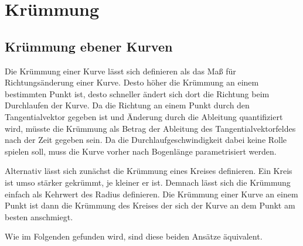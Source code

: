 \section{Krümmung}
\subsection{Krümmung ebener Kurven}

Die Krümmung einer Kurve lässt sich definieren als das Maß für
Richtungsänderung einer Kurve. Desto höher die Krümmung an einem
bestimmten Punkt ist, desto schneller ändert sich dort die
Richtung beim Durchlaufen der Kurve. Da die Richtung an einem
Punkt durch den Tangentialvektor gegeben ist und Änderung
durch die Ableitung quantifiziert wird, müsste die Krümmung
als Betrag der Ableitung des Tangentialvektorfeldes nach der Zeit
gegeben sein. Da die Durchlaufgeschwindigkeit dabei keine Rolle spielen
soll, muss die Kurve vorher nach Bogenlänge parametrisiert werden.

Alternativ lässt sich zunächst die Krümmung eines Kreises definieren.
Ein Kreis ist umso stärker gekrümmt, je kleiner er ist. Demnach lässt
sich die Krümmung einfach als Kehrwert des Radius definieren. Die
Krümmung einer Kurve an einem Punkt ist dann die Krümmung des Kreises
der sich der Kurve an dem Punkt am besten anschmiegt.

Wie im Folgenden gefunden wird, sind diese beiden Ansätze äquivalent.

